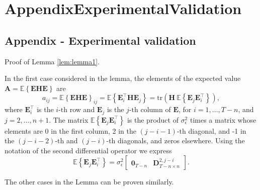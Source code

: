\chapter{AppendixExperimentalValidation} \label{chap:AppendixExperimentalValidation}


\section{Appendix - Experimental validation}

Proof of Lemma \ref{lem:lemma1}. 

In the first case considered in the lemma,
the elements of the expected value $\mathbf{A} = \mathbb{E} \left\{ \mathbf{E} \mathbf{H} \mathbf{E} \right\}$ are
\[ a_{ij} = \mathbb{E} \left\{ \mathbf{E} \mathbf{H} \mathbf{E} \right\}_{ij} = \mathbb{E} \left\{ \mathbf{E}_i^\top \mathbf{H} \mathbf{E}_j \right\} = \mathrm{tr} \left( \mathbf{H} \ \mathbb{E} \left\{ \mathbf{E}_j \mathbf{E}_i^\top \right\} \right) , \]
where $\mathbf{E}_i^\top$ is the $i\text{-th}$ row and $\mathbf{E}_j$ is the $j\text{-th}$ column of $\mathbf{E}$, for $i = 1, \ldots, T-n$, and $j = 2, \ldots, n+1$.
The matrix $\mathbb{E} \left\{ \mathbf{E}_j \mathbf{E}_i^\top \right\}$ is the product of $\sigma_{\epsilon}^2$ times a matrix whose elements are 0 in the first column, 2 in the $(j-i-1) \text{-th}$ diagonal, and -1 in the $(j-i-2) \text{-th}$ and $(j-i) \text{-th}$ diagonals, and zeros elsewhere.
Using the notation of the second differential operator we express
\[ \mathbb{E} \left\{ \mathbf{E}_j \mathbf{E}_i^\top \right\} = \sigma_{\epsilon}^2 \begin{bmatrix} \mathbf{0}_{T-n} & \mathbf{D}_{T-n \times n}^{2, j-i} \end{bmatrix}. \]

The other cases in the Lemma can be proven similarly.

